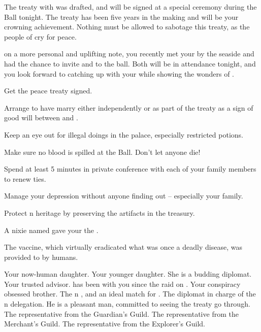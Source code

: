 \documentclass[char]{NeptuneBall}
\begin{document}
The treaty with \pPacifica{} was drafted, and will be signed at a special ceremony during the Ball tonight. The treaty has been five years in the making and will be your crowning achievement. Nothing must be allowed to sabotage this treaty, as the people of \pAtlantis{} cry for peace.

on a more personal and uplifting note, you recently met your \cAriel{\offspring} by the seaside and had the chance to invite \cAriel{\them} and \cAriel{\their} \cWillow{\offspring} to the ball. Both will be in attendance tonight, and you look forward to catching up with your \cAriel{\offsping} while showing \cWillow{} the wonders of \pAtlantis{}.

\begin{itemz}[Goals]
  \item Get the peace treaty signed.
  \item Arrange to have \cPrincess{} marry \cPrince{} either independently or as part of the treaty as a sign of good will between \pAtlantis{} and \pPacifica{}.
  \item Keep an eye out for illegal doings in the palace, especially restricted potions.
  \item Make sure no blood is spilled at the Ball. Don't let anyone die!
  \item Spend at least 5 minutes in private conference with each of your family members to renew ties.
  \item Manage your depression without anyone finding out -- especially your family.
  \item Protect \pAtlantis{}n heritage by preserving the artifacts in the treasury.
\end{itemz}

\begin{itemz}[Trivia]
	\item A nixie named \cNixie{} gave your \cExKing{\parent} the \iTrident{}.
  \item The \pPolio{} vaccine, which virtually eradicated what was once a deadly disease, was provided to \pAtlantis{} by humans.
\end{itemz}

\begin{contacts}
  \contact{\cAriel{}} Your now-human daughter.
  \contact{\cPrincess{}} Your younger daughter. She is a budding diplomat.
  \contact{\cManta{}} Your trusted advisor. \cManta{\They{}} has been with you since the raid on \pPacifica{}.
  \contact{\cPlant{}} Your conspiracy obsessed brother.
  \contact{\cPrince{}} The \pPacifica{}n \cPrince{\prince}, and an ideal match for \cPrincess{}.
  \contact{\cDiplomat{}} The diplomat in charge of the \pPacifica{}n delegation. He is a pleasant man, committed to seeing the treaty go through.
  \contact{\cGeneral{}} The representative from the Guardian's Guild.
  \contact{\cSlave{}} The representative from the Merchant's Guild.
  \contact{\cPriest{}} The representative from the Explorer's Guild.
\end{contacts}
\end{document}
